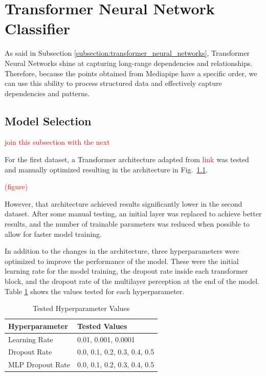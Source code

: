 \section{Transformer Neural Network Classifier}

As said in Subsection \ref{subsection:transformer_neural_networks}, Transformer Neural Networks shine at capturing long-range dependencies and relationships. Therefore, because the points obtained from Mediapipe have a specific order, we can use this ability to process structured data and effectively capture dependencies and patterns.

\subsection{Model Selection}

\textcolor{red}{join this subsection with the next}

For the first dataset, a Transformer architecture adapted from \textcolor{red}{link} was tested and manually optimized resulting in the architecture in Fig.~\ref{}.

\textcolor{red}{(figure)}

However, that architecture achieved results significantly lower in the second dataset. After some manual testing, an initial layer was replaced to achieve better results, and the number of trainable parameters was reduced when possible to allow for faster model training.

In addition to the changes in the architecture, three hyperparameters were optimized to improve the performance of the model. These were the initial learning rate for the model training, the dropout rate inside each transformer block, and the dropout rate of the multilayer perception at the end of the model. Table \ref{table:transformer_hyperparameters} shows the values tested for each hyperparameter.

\begin{table}[H]
    \centering
    \caption{Tested Hyperparameter Values}
    \label{table:transformer_hyperparameters}
    \begin{tabular}{|l|l|}
        \hline
        Hyperparameter & Tested Values \\
        \hline
        Learning Rate & 0.01, 0.001, 0.0001 \\
        \hline
        Dropout Rate & 0.0, 0.1, 0.2, 0.3, 0.4, 0.5 \\
        \hline
        MLP Dropout Rate & 0.0, 0.1, 0.2, 0.3, 0.4, 0.5 \\
        \hline
    \end{tabular}
\end{table}

